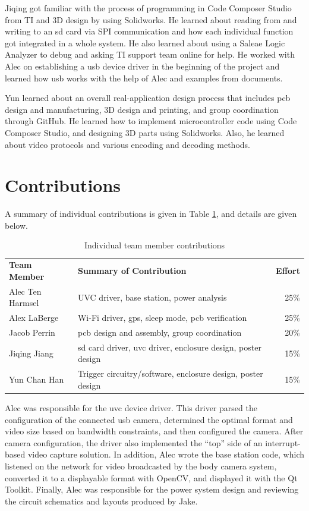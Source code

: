 \documentclass[12pt]{article}
\begin{document}
Jiqing got familiar with the process of programming in Code Composer Studio
from TI and 3D design by using Solidworks. He learned about reading from and
writing to an \gls{sd} card via SPI communication and how each individual
function got integrated in a whole system. He also learned about using a Saleae
Logic Analyzer to debug and asking TI support team online for help. He worked
with Alec on establishing a \gls{usb} device driver in the beginning of the
project and learned how \gls{usb} works with the help of Alec and examples from
documents.

Yun learned about an overall real-application design process that includes
\gls{pcb} design and manufacturing, 3D design and printing, and group
coordination through GitHub. He learned how to implement microcontroller code
using Code Composer Studio, and designing 3D parts using Solidworks. Also, he
learned about video protocols and various encoding and decoding methods.

\section{Contributions}
A summary of individual contributions is given in Table
\ref{tab:individual_contrib}, and details are given below.

\begin{table}[h]
    \centering
    \caption{Individual team member contributions}
    \vspace{1.0em}
    \begin{tabular}{llr}
        \textbf{Team Member} & \textbf{Summary of Contribution} & \textbf{Effort}\\
        Alec Ten Harmsel & UVC driver, base station, power analysis & 25\%\\
        Alex LaBerge & Wi-Fi driver, \gls{gps}, sleep mode, \gls{pcb} verification & 25\%\\
        Jacob Perrin & \gls{pcb} design and assembly, group coordination & 20\%\\
        Jiqing Jiang & \gls{sd} card driver, \gls{uvc} driver, enclosure design, poster design & 15\%\\
        Yun Chan Han & Trigger circuitry/software, enclosure design, poster design & 15\%\\
    \end{tabular}
    \label{tab:individual_contrib}
\end{table}

Alec was responsible for the \gls{uvc} device driver. This driver parsed the
configuration of the connected \gls{usb} camera, determined the optimal format
and video size based on bandwidth constraints, and then configured the camera.
After camera configuration, the driver also implemented the “top” side of an
interrupt-based video capture solution. In addition, Alec wrote the base
station code, which listened on the network for video broadcasted by the body
camera system, converted it to a displayable format with OpenCV, and displayed
it with the Qt Toolkit. Finally, Alec was responsible for the power system
design and reviewing the circuit schematics and layouts produced by Jake.
\end{document}
